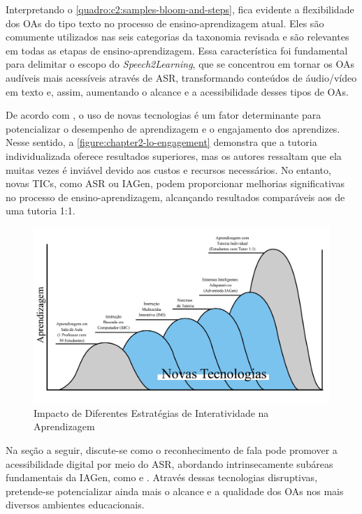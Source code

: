 Interpretando o \autoref{quadro:c2:samples-bloom-and-steps}, fica evidente a flexibilidade dos OAs do tipo texto no processo de ensino-aprendizagem atual. Eles são comumente utilizados nas seis categorias da taxonomia revisada e são relevantes em todas as etapas de ensino-aprendizagem. Essa característica foi fundamental para delimitar o escopo do \textit{Speech2Learning}, que se concentrou em tornar os OAs audíveis mais acessíveis através de ASR, transformando conteúdos de áudio/vídeo em texto e, assim, aumentando o alcance e a acessibilidade desses tipos de OAs.

De acordo com , o uso de novas tecnologias é um fator determinante para potencializar o desempenho de aprendizagem e o engajamento dos aprendizes. Nesse sentido, a \autoref{figure:chapter2-lo-engagement} demonstra que a tutoria individualizada oferece resultados superiores, mas os autores ressaltam que ela muitas vezes é inviável devido aos custos e recursos necessários. No entanto, novas TICs, como ASR ou IAGen, podem proporcionar melhorias significativas no processo de ensino-aprendizagem, alcançando resultados comparáveis aos de uma tutoria 1:1.

\begin{figure}[htb]
\centering
\caption{Impacto de Diferentes Estratégias de Interatividade na Aprendizagem}
\label{figure:chapter2-lo-engagement}
\includegraphics[width=.96\textwidth]{images/chapter2-lo-engagement.jpg}
\end{figure}

Na seção a seguir, discute-se como o reconhecimento de fala pode promover a acessibilidade digital por meio do ASR, abordando intrinsecamente subáreas fundamentais da IAGen, como  e . Através dessas tecnologias disruptivas, pretende-se potencializar ainda mais o alcance e a qualidade dos OAs nos mais diversos ambientes educacionais.

